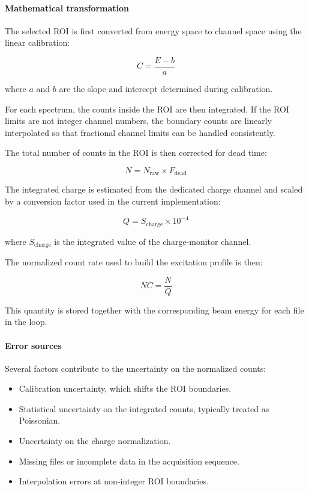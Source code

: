 \hypertarget{mathematical-transformation-2}{%
\paragraph{Mathematical
transformation}\label{mathematical-transformation-2}}

The selected ROI is first converted from energy space to channel space
using the linear calibration:

\[
C = \frac{E-b}{a}
\]

where \(a\) and \(b\) are the slope and intercept determined during
calibration.

For each spectrum, the counts inside the ROI are then integrated. If the
ROI limits are not integer channel numbers, the boundary counts are
linearly interpolated so that fractional channel limits can be handled
consistently.

The total number of counts in the ROI is then corrected for dead time:

\[
N = N_{\mathrm{raw}} \times F_{\mathrm{dead}}
\]

The integrated charge is estimated from the dedicated charge channel and
scaled by a conversion factor used in the current implementation:

\[
Q = S_{\mathrm{charge}} \times 10^{-4}
\]

where \(S_{\mathrm{charge}}\) is the integrated value of the
charge-monitor channel.

The normalized count rate used to build the excitation profile is then:

\[
NC = \frac{N}{Q}
\]

This quantity is stored together with the corresponding beam energy for
each file in the loop.

\hypertarget{error-sources-2}{%
\paragraph{Error sources}\label{error-sources-2}}

Several factors contribute to the uncertainty on the normalized counts:

\begin{itemize}
\tightlist
\item
  Calibration uncertainty, which shifts the ROI boundaries.
\item
  Statistical uncertainty on the integrated counts, typically treated as
  Poissonian.
\item
  Uncertainty on the charge normalization.
\item
  Missing files or incomplete data in the acquisition sequence.
\item
  Interpolation errors at non-integer ROI boundaries.
\end{itemize}

